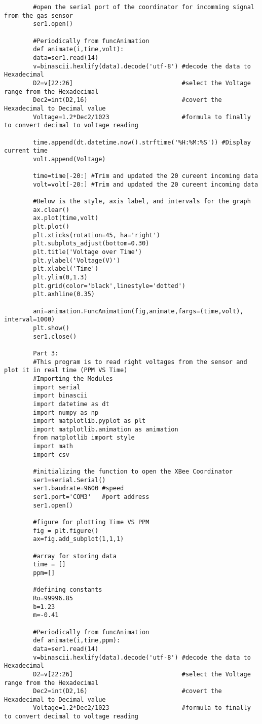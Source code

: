 \begin{lstlisting}
		#open the serial port of the coordinator for incomming signal from the gas sensor		
		ser1.open()
			
		#Periodically from funcAnimation	
		def animate(i,time,volt):	
		data=ser1.read(14)		
		v=binascii.hexlify(data).decode('utf-8') #decode the data to Hexadecimal	
		D2=v[22:26]                              #select the Voltage range from the Hexadecimal	
		Dec2=int(D2,16)                          #covert the Hexadecimal to Decimal value		
		Voltage=1.2*Dec2/1023                    #formula to finally to convert decimal to voltage reading
						
		time.append(dt.datetime.now().strftime('%H:%M:%S')) #Display current time 		
		volt.append(Voltage)
				
		time=time[-20:] #Trim and updated the 20 cureent incoming data 		
		volt=volt[-20:] #Trim and updated the 20 cureent incoming data 
			
		#Below is the style, axis label, and intervals for the graph		
		ax.clear()		
		ax.plot(time,volt) 		
		plt.plot()		
		plt.xticks(rotation=45, ha='right')		
		plt.subplots_adjust(bottom=0.30)		
		plt.title('Voltage over Time')		
		plt.ylabel('Voltage(V)')		
		plt.xlabel('Time')		
		plt.ylim(0,1.3)		
		plt.grid(color='black',linestyle='dotted')		
		plt.axhline(0.35)
			
		ani=animation.FuncAnimation(fig,animate,fargs=(time,volt), interval=1000)		
		plt.show()		
		ser1.close()
						
		Part 3:		
		#This program is to read right voltages from the sensor and plot it in real time (PPM VS Time)		
		#Importing the Modules
		import serial		
		import binascii		
		import datetime as dt		
		import numpy as np		
		import matplotlib.pyplot as plt		
		import matplotlib.animation as animation		
		from matplotlib import style		
		import math		
		import csv
				
		#initializing the function to open the XBee Coordinator		
		ser1=serial.Serial()
		ser1.baudrate=9600 #speed		
		ser1.port='COM3'   #port address		
		ser1.open()
				
		#figure for plotting Time VS PPM		
		fig = plt.figure()		
		ax=fig.add_subplot(1,1,1)
				
		#array for storing data		
		time = []
		ppm=[]
				
		#defining constants		
		Ro=99996.85		
		b=1.23		
		m=-0.41
				
		#Periodically from funcAnimation		
		def animate(i,time,ppm):	
		data=ser1.read(14)		
		v=binascii.hexlify(data).decode('utf-8') #decode the data to Hexadecimal	
		D2=v[22:26]                              #select the Voltage range from the Hexadecimal		
		Dec2=int(D2,16)                          #covert the Hexadecimal to Decimal value		
		Voltage=1.2*Dec2/1023                    #formula to finally to convert decimal to voltage reading
						

\end{lstlisting}
